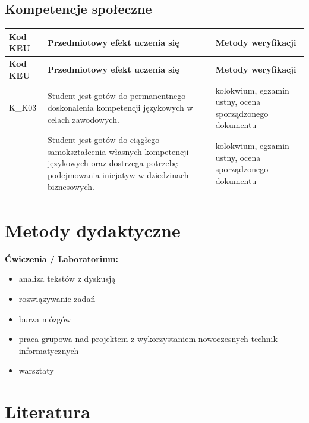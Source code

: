 \documentclass[12pt, a4paper]{article}
\newcommand{\thdrule}{\noalign{\global\setlength{\extrarowheight}{0pt}}}
\newcommand{\thdend}{\noalign{\global\setlength{\extrarowheight}{3pt}}}
\begin{document}
\subsection*{Kompetencje społeczne}
{\scriptsize
\begin{longtable}{m{1.6cm}m{9.0cm}m{4.2cm}}
\thdrule\toprule
\rowcolor{pjatkRed} {\color{white}\footnotesize\textbf{\vphantom{Ag}Kod KEU}} & {\color{white}\footnotesize\textbf{\vphantom{Ag}Przedmiotowy efekt uczenia się}} & {\color{white}\footnotesize\textbf{\vphantom{Ag}Metody weryfikacji}} \\
\midrule\thdend
\endfirsthead
\thdrule\toprule
\rowcolor{pjatkRed} {\color{white}\footnotesize\textbf{\vphantom{Ag}Kod KEU}} & {\color{white}\footnotesize\textbf{\vphantom{Ag}Przedmiotowy efekt uczenia się}} & {\color{white}\footnotesize\textbf{\vphantom{Ag}Metody weryfikacji}} \\
\midrule\thdend
\endhead
  \rowcolor{tableRowLight} K\_K03 & Student jest gotów do permanentnego doskonalenia kompetencji językowych w celach zawodowych. & kolokwium, egzamin ustny, ocena sporządzonego dokumentu \\
  \rowcolor{tableRowAlt}  & Student jest gotów do ciągłego samokształcenia własnych kompetencji językowych oraz dostrzega potrzebę podejmowania inicjatyw w dziedzinach biznesowych. & kolokwium, egzamin ustny, ocena sporządzonego dokumentu \\
\bottomrule
\end{longtable}}

\section{Metody dydaktyczne}

\textbf{Ćwiczenia / Laboratorium:}
\begin{itemize}
  \item analiza tekstów z dyskusją
  \item rozwiązywanie zadań
  \item burza mózgów
  \item praca grupowa nad projektem z wykorzystaniem nowoczesnych technik informatycznych
  \item warsztaty
\end{itemize}
\vspace{4pt}


\section{Literatura}
\end{document}
